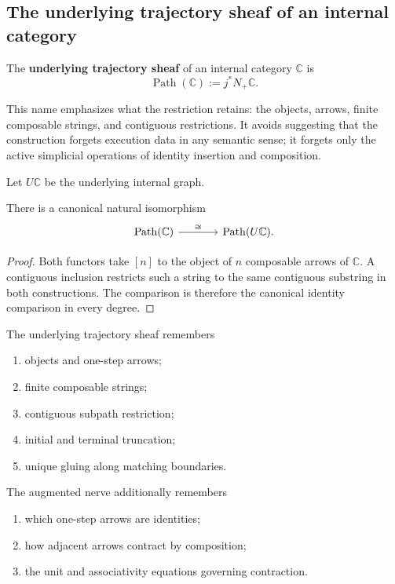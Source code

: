 \subsection{The underlying trajectory sheaf of an internal category}
\label{subsec:underlying-trajectory-sheaf}

\begin{definition}
\label{def:underlying-trajectory-sheaf}
The \textbf{underlying trajectory sheaf} of an internal category \(\mathbb C\)
is
\[
    \operatorname{Path}(\mathbb C)
    :=
    j^\ast N_+\mathbb C.
\]
\end{definition}

This name emphasizes what the restriction retains: the objects, arrows,
finite composable strings, and contiguous restrictions. It avoids suggesting
that the construction forgets execution data in any semantic sense; it forgets
only the active simplicial operations of identity insertion and composition.

Let \(U\mathbb C\) be the underlying internal graph.

\begin{proposition}
\label{prop:category-paths-underlying-graph}
There is a canonical natural isomorphism
\[
\begin{tikzcd}[column sep=large]
    \operatorname{Path}(\mathbb C)
        \arrow[r, "\cong"]
    &
    \operatorname{Path}(U\mathbb C).
\end{tikzcd}
\]
\end{proposition}

\begin{proof}
Both functors take \([n]\) to the object of \(n\) composable arrows of
\(\mathbb C\). A contiguous inclusion restricts such a string to the same
contiguous substring in both constructions. The comparison is therefore the
canonical identity comparison in every degree.
\end{proof}

The underlying trajectory sheaf remembers
\begin{enumerate}
    \item objects and one-step arrows;
    \item finite composable strings;
    \item contiguous subpath restriction;
    \item initial and terminal truncation;
    \item unique gluing along matching boundaries.
\end{enumerate}
The augmented nerve additionally remembers
\begin{enumerate}
    \item which one-step arrows are identities;
    \item how adjacent arrows contract by composition;
    \item the unit and associativity equations governing contraction.
\end{enumerate}

